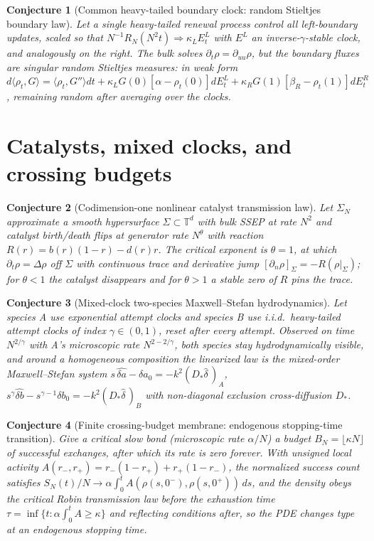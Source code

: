 \documentclass[11pt]{article}
\newtheorem{conjecture}{Conjecture}
\theoremstyle{definition}
\begin{document}
\begin{conjecture}[Common heavy-tailed boundary clock: random Stieltjes boundary law]\label{an6}
Let a single heavy-tailed renewal process control all left-boundary updates, scaled so that $N^{-1}R_N(N^2t)\Rightarrow\kappa_LE_t^L$ with $E^L$ an inverse-$\gamma$-stable clock, and analogously on the right.  The bulk solves $\partial_t\rho=\partial_{uu}\rho$, but the boundary fluxes are singular random Stieltjes measures: in weak form $d\langle\rho_t,G\rangle=\langle\rho_t,G''\rangle dt+\kappa_LG(0)[\alpha-\rho_t(0)]dE_t^L+\kappa_RG(1)[\beta_R-\rho_t(1)]dE_t^R$, remaining random after averaging over the clocks.
\end{conjecture}

\section{Catalysts, mixed clocks, and crossing budgets}

\begin{conjecture}[Codimension-one nonlinear catalyst transmission law]\label{an7}
Let $\Sigma_N$ approximate a smooth hypersurface $\Sigma\subset\mathbb T^d$ with bulk SSEP at rate $N^2$ and catalyst birth/death flips at generator rate $N^\theta$ with reaction $R(r)=b(r)(1-r)-d(r)r$.  The critical exponent is $\theta=1$, at which $\partial_t\rho=\Delta\rho$ off $\Sigma$ with continuous trace and derivative jump $[\partial_n\rho]_\Sigma=-R(\rho|_\Sigma)$; for $\theta<1$ the catalyst disappears and for $\theta>1$ a stable zero of $R$ pins the trace.
\end{conjecture}

\begin{conjecture}[Mixed-clock two-species Maxwell--Stefan hydrodynamics]\label{an8}
Let species A use exponential attempt clocks and species B use i.i.d.\ heavy-tailed attempt clocks of index $\gamma\in(0,1)$, reset after every attempt.  Observed on time $N^{2/\gamma}$ with A's microscopic rate $N^{2-2/\gamma}$, both species stay hydrodynamically visible, and around a homogeneous composition the linearized law is the mixed-order Maxwell--Stefan system $s\,\widehat{\delta a}-\delta a_0=-k^2(D_*\widehat{\delta}\,)_A$, $s^\gamma\widehat{\delta b}-s^{\gamma-1}\delta b_0=-k^2(D_*\widehat{\delta}\,)_B$ with non-diagonal exclusion cross-diffusion $D_*$.
\end{conjecture}

\begin{conjecture}[Finite crossing-budget membrane: endogenous stopping-time transition]\label{an9}
Give a critical slow bond (microscopic rate $\alpha/N$) a budget $B_N=\lfloor\kappa N\rfloor$ of successful exchanges, after which its rate is zero forever.  With unsigned local activity $A(r_-,r_+)=r_-(1-r_+)+r_+(1-r_-)$, the normalized success count satisfies $S_N(t)/N\to\alpha\int_0^tA(\rho(s,0^-),\rho(s,0^+))\,ds$, and the density obeys the critical Robin transmission law before the exhaustion time $\tau=\inf\{t:\alpha\int_0^tA\ge\kappa\}$ and reflecting conditions after, so the PDE changes type at an endogenous stopping time.
\end{conjecture}
\end{document}
